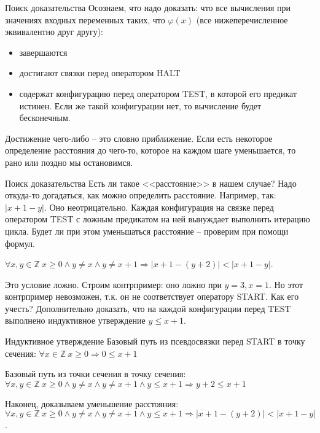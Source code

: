 \documentclass[hyperref={unicode=true}]{beamer}
\begin{document}
    \begin{frame}{Поиск доказательства}
    Осознаем, что надо доказать: что все вычисления при значениях входных переменных таких, что $\varphi(x)$ (все нижеперечисленное эквивалентно друг другу):
    \begin{itemize}
    \item завершаются
    \item достигают связки перед оператором HALT
    \item содержат конфигурацию перед оператором TEST, в которой его предикат истинен. Если же такой конфигурации нет, то вычисление будет бесконечным.
    \end{itemize}

    Достижение чего-либо -- это словно приближение. Если есть некоторое определение расстояния до чего-то, которое на каждом шаге уменьшается, то рано или поздно мы остановимся.
    \end{frame}

    \begin{frame}{Поиск доказательства}
    Есть ли такое <<расстояние>> в нашем случае? Надо откуда-то догадаться, как можно определить расстояние. Например, так: $|x + 1 - y|$. Оно неотрицательно. Каждая конфигурация на связке перед оператором TEST с ложным предикатом на ней вынуждает выполнить итерацию цикла. Будет ли при этом уменьшаться расстояние -- проверим при помощи формул.

    $\forall x, y \in \mathbb{Z} ~ x \geq 0 \land y \neq x \land y \neq x + 1 \Rightarrow |x + 1 - (y + 2)| < |x + 1 - y|$.

    Это условие ложно. Строим контрпример: оно ложно при $y = 3, x = 1$. Но этот контрпример невозможен, т.к. он не соответствует оператору START. Как его учесть? Дополнительно доказать, что на каждой конфигурации перед TEST выполнено индуктивное утверждение $y \leq x + 1$.
    \end{frame}

    \begin{frame}{Индуктивное утверждение}
    Базовый путь из псевдосвязки перед START в точку сечения: $\forall x \in \mathbb{Z} ~ x \geq 0 \Rightarrow 0 \leq x + 1$

    Базовый путь из точки сечения в точку сечения: $\forall x, y \in \mathbb{Z} ~ x \geq 0 \land y \neq x \land y \neq x + 1 \land y \leq x + 1 \Rightarrow y + 2 \leq x + 1$

    Наконец, доказываем уменьшение расстояния:
    $\forall x, y \in \mathbb{Z} ~ x \geq 0 \land y \neq x \land y \neq x + 1 \land y \leq x + 1 \Rightarrow |x + 1 - (y + 2)| < |x + 1 - y|$.
    \end{frame}
\end{document}
